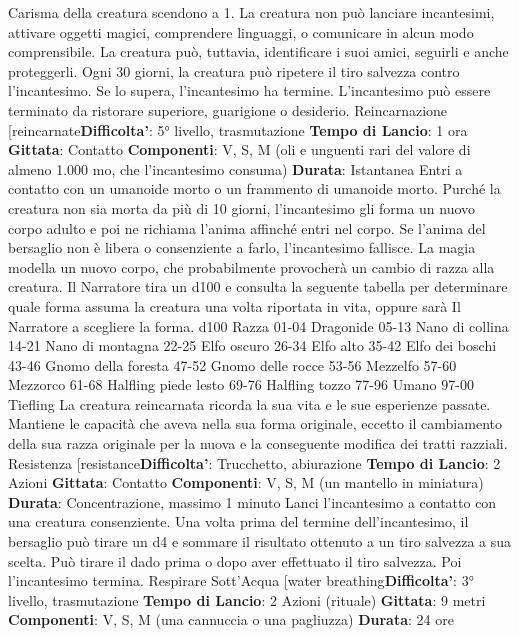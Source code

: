 \begin{multicols}{2}
Carisma della creatura scendono a 1. La creatura non
può lanciare incantesimi, attivare oggetti magici,
comprendere linguaggi, o comunicare in alcun modo
comprensibile. La creatura può, tuttavia, identificare i
suoi amici, seguirli e anche proteggerli.
Ogni 30 giorni, la creatura può ripetere il tiro salvezza
contro l’incantesimo. Se lo supera, l’incantesimo ha
termine.
L’incantesimo può essere terminato da ristorare
superiore, guarigione o desiderio.
Reincarnazione
[reincarnate\textbf{Difficolta'}:
5° livello, trasmutazione
\textbf{Tempo di Lancio}: 1 ora
\textbf{Gittata}: Contatto
\textbf{Componenti}: V, S, M (oli e unguenti rari del valore di
almeno 1.000 mo, che l’incantesimo consuma)
\textbf{Durata}: Istantanea
Entri a contatto con un umanoide morto o un frammento
di umanoide morto. Purché la creatura non sia morta da
più di 10 giorni, l’incantesimo gli forma un nuovo corpo
adulto e poi ne richiama l’anima affinché entri nel corpo.
Se l’anima del bersaglio non è libera o consenziente a
farlo, l’incantesimo fallisce.
La magia modella un nuovo corpo, che probabilmente
provocherà un cambio di razza alla creatura. Il Narratore tira
un d100 e consulta la seguente tabella per determinare
quale forma assuma la creatura una volta riportata in
vita, oppure sarà Il Narratore a scegliere la forma.
d100 Razza
01-04 Dragonide
05-13 Nano di collina
14-21 Nano di montagna
22-25 Elfo oscuro
26-34 Elfo alto
35-42 Elfo dei boschi
43-46 Gnomo della foresta
47-52 Gnomo delle rocce
53-56 Mezzelfo
57-60 Mezzorco
61-68 Halfling piede lesto
69-76 Halfling tozzo
77-96 Umano
97-00 Tiefling
La creatura reincarnata ricorda la sua vita e le sue
esperienze passate. Mantiene le capacità che aveva
nella sua forma originale, eccetto il cambiamento della
sua razza originale per la nuova e la conseguente
modifica dei tratti razziali.
Resistenza
[resistance\textbf{Difficolta'}:
Trucchetto, abiurazione
\textbf{Tempo di Lancio}: 2 Azioni
\textbf{Gittata}: Contatto
\textbf{Componenti}: V, S, M (un mantello in miniatura)
\textbf{Durata}: Concentrazione, massimo 1 minuto
Lanci l’incantesimo a contatto con una creatura
consenziente. Una volta prima del termine
dell’incantesimo, il bersaglio può tirare un d4 e
sommare il risultato ottenuto a un tiro salvezza a sua
scelta. Può tirare il dado prima o dopo aver effettuato il
tiro salvezza. Poi l’incantesimo termina.
Respirare Sott’Acqua
[water breathing\textbf{Difficolta'}:
3° livello, trasmutazione
\textbf{Tempo di Lancio}: 2 Azioni (rituale)
\textbf{Gittata}: 9 metri
\textbf{Componenti}: V, S, M (una cannuccia o una pagliuzza)
\textbf{Durata}: 24 ore

\end{multicols}
